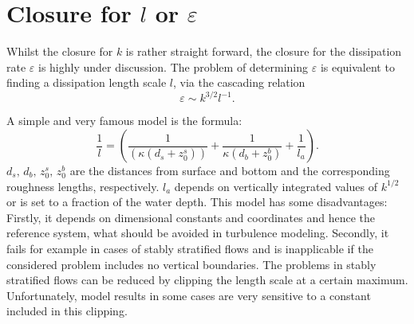 \section{Closure for $l$ or $\varepsilon$}

Whilst the closure for $k$ is rather straight forward, the closure for the 
dissipation rate $\varepsilon$ is highly under discussion. The problem of 
determining $\varepsilon$ is equivalent to finding a dissipation length scale 
$l$, via the cascading relation \citep[][]{UmlaufBurchard2005a} 
\begin{equation}
 \label{cascad}
 \varepsilon \sim k^{3 \slash 2} l^{-1}.
\end{equation}

A simple and very famous model is the \cite{blackadar1962} formula:
\begin{equation}
 \label{blackadar}
 \frac{1}{l} = \left( \frac{1}{(\kappa (d_s + z_0^s) )} + \frac{1}{\kappa (d_b + 
z_0^b)} + \frac{1}{l_a} \right).
\end{equation}
$d_s,\, d_b,\, z_0^s,\, z_0^b$ are the distances from surface and bottom and 
the corresponding roughness lengths, respectively. $l_a$ depends on vertically 
integrated values of $k^{1 \slash 2}$ or is set to a fraction of the water 
depth. This model has some disadvantages: Firstly, it depends on dimensional 
constants and coordinates and hence the reference system, what should be 
avoided in turbulence modeling. Secondly, it fails for example in cases of 
stably stratified flows and is inapplicable if the considered problem includes 
no vertical boundaries. The problems in stably stratified flows can be reduced 
by clipping the length scale at a certain maximum. Unfortunately, model results 
in some cases are very sensitive to a constant included in this clipping. 

